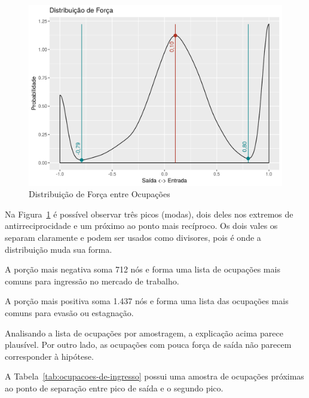 \documentclass[12pt,a4paper]{article}
\begin{document}
\begin{figure}[htb]
    \centering
    \includegraphics[scale=0.8]{distribuicao-de-forca.png}
    \caption{Distribuição de Força entre Ocupações}
    \label{fig:ditribuicao-de-forca}
\end{figure}

Na Figura~\ref{fig:ditribuicao-de-forca} é possível observar três picos (modas), dois deles nos extremos de antirreciprocidade e um próximo ao ponto mais recíproco. Os dois vales os separam claramente e podem ser usados como divisores, pois é onde a distribuição muda sua forma.

A porção mais negativa soma 712 nós e forma uma lista de ocupações mais comuns para ingressão no mercado de trabalho.

A porção mais positiva soma 1.437 nós e forma uma lista das ocupações mais comuns para evasão ou estagnação.

Analisando a lista de ocupações por amostragem, a explicação acima parece plausível. Por outro lado, as ocupações com pouca força de saída não parecem corresponder à hipótese.

A Tabela~\ref{tab:ocupacoes-de-ingresso} possui uma amostra de ocupações próximas ao ponto de separação entre pico de saída e o segundo pico.
\end{document}
